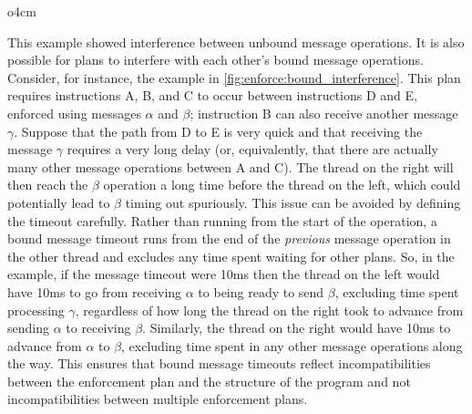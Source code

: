\begin{wrapfigure}{o}{4cm}
  \vspace{-12pt}
  \vspace{-12pt}
\end{wrapfigure}
This example showed interference between unbound message operations.
It is also possible for plans to interfere with each other's bound
message operations.  Consider, for instance, the example in
\autoref{fig:enforce:bound_interference}.  This plan requires
instructions A, B, and C to occur between instructions D and E,
enforced using messages $\alpha$ and $\beta$; instruction B can also
receive another message $\gamma$.  Suppose that the path from D to E
is very quick and that receiving the message $\gamma$ requires a very
long delay (or, equivalently, that there are actually many other
message operations between A and C).  The thread on the right will
then reach the $\beta$ operation a long time before the thread on the
left, which could potentially lead to $\beta$ timing out spuriously.
This issue can be avoided by defining the timeout carefully.  Rather
than running from the start of the operation, a bound message timeout
runs from the end of the \emph{previous} message operation in the
other thread and excludes any time spent waiting for other plans.  So,
in the example, if the message timeout were 10ms then the thread on
the left would have 10ms to go from receiving $\alpha$ to being ready
to send $\beta$, excluding time spent processing $\gamma$, regardless
of how long the thread on the right took to advance from sending
$\alpha$ to receiving $\beta$.  Similarly, the thread on the right
would have 10ms to advance from $\alpha$ to $\beta$, excluding time
spent in any other message operations along the way.  This ensures
that bound message timeouts reflect incompatibilities between the
enforcement plan and the structure of the program and not
incompatibilities between multiple enforcement plans.

